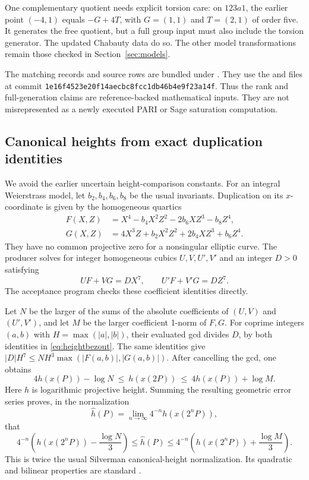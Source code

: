 \documentclass[11pt,letterpaper]{article}
\theoremstyle{definition}\newtheorem{definition}[theorem]{Definition}
\theoremstyle{remark}\newtheorem{remark}[theorem]{Remark}
\begin{document}
One complementary quotient needs explicit torsion care: on $123a1$, the earlier point $(-4,1)$ equals $-G+4T$, with $G=(1,1)$ and $T=(2,1)$ of order five. It generates the free quotient, but a full group input must also include the torsion generator. The updated Chabauty data do so. The other model transformations remain those checked in Section~\ref{sec:models}.

The matching records and source rows are bundled under . They use the  and  files at commit \texttt{1e16f4523e20f14aecbc8fcc1db46b4e9f23a14f}. Thus the rank and full-generation claims are reference-backed mathematical inputs. They are not misrepresented as a newly executed PARI or Sage saturation computation.

\subsection{Canonical heights from exact duplication identities}
We avoid the earlier uncertain height-comparison constants. For an integral Weierstrass model, let $b_2,b_4,b_6,b_8$ be the usual invariants. Duplication on its $x$-coordinate is given by the homogeneous quartics
\begin{align*}
F(X,Z)&=X^4-b_4X^2Z^2-2b_6XZ^3-b_8Z^4,\\
G(X,Z)&=4X^3Z+b_2X^2Z^2+2b_4XZ^3+b_6Z^4.
\end{align*}
They have no common projective zero for a nonsingular elliptic curve. The producer solves for integer homogeneous cubics $U,V,U',V'$ and an integer $D>0$ satisfying
\begin{equation}\label{eq:heightbezout}
UF+VG=DX^7,\qquad U'F+V'G=DZ^7.
\end{equation}
The acceptance program checks these coefficient identities directly.

Let $N$ be the larger of the sums of the absolute coefficients of $(U,V)$ and $(U',V')$, and let $M$ be the larger coefficient 1-norm of $F,G$. For coprime integers $(a,b)$ with $H=\max(|a|,|b|)$, their evaluated gcd divides $D$, by both identities in \eqref{eq:heightbezout}. The same identities give $|D|H^7\le NH^3\max(|F(a,b)|,|G(a,b)|)$. After cancelling the gcd, one obtains
\begin{equation}\label{eq:dupheight}
4h(x(P))-\log N\ \le\ h(x(2P))\ \le\ 4h(x(P))+\log M.
\end{equation}
Here $h$ is logarithmic projective height. Summing the resulting geometric error series proves, in the normalization
\[
\widehat h(P)=\lim_{n\to\infty}4^{-n}h(x(2^nP)),
\]
that
\begin{equation}\label{eq:heightinterval}
4^{-n}\left(h(x(2^nP))-\frac{\log N}{3}\right)
\le\widehat h(P)\le
4^{-n}\left(h(x(2^nP))+\frac{\log M}{3}\right).
\end{equation}
This is twice the usual Silverman canonical-height normalization. Its quadratic and bilinear properties are standard \cite[Chapter VIII]{SilvermanAEC}.
\end{document}
